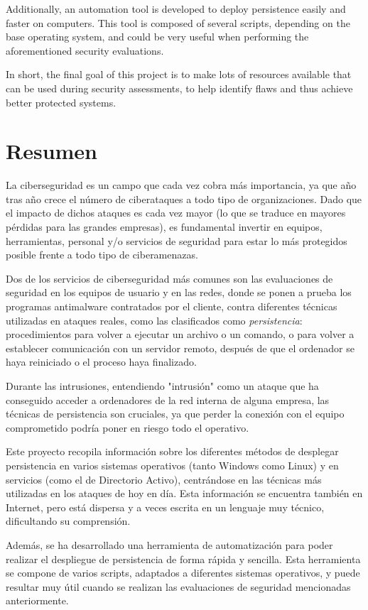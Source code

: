 Additionally, an automation tool is developed to deploy persistence easily and faster on computers. This tool is composed of several scripts, depending on the base operating system, and could be very useful when performing the aforementioned security evaluations.

In short, the final goal of this project is to make lots of resources available that can be used during security assessments, to help identify flaws and thus achieve better protected systems.

\pagebreak
\section*{Resumen} 

La ciberseguridad es un campo que cada vez cobra más importancia, ya que año tras año crece el número de ciberataques a todo tipo de organizaciones. 
Dado que el impacto de dichos ataques es cada vez mayor (lo que se traduce en mayores pérdidas para las grandes empresas), es fundamental invertir en equipos, herramientas, personal y/o servicios de seguridad para estar lo más protegidos posible frente a todo tipo de ciberamenazas.

Dos de los servicios de ciberseguridad más comunes son las evaluaciones de seguridad en los equipos de usuario y en las redes, donde se ponen a prueba los programas antimalware contratados por el cliente, contra diferentes técnicas utilizadas en ataques reales, como las clasificados como \textit{persistencia}: procedimientos para volver a ejecutar un archivo o un comando, o para volver a establecer comunicación con un servidor remoto, después de que el ordenador se haya reiniciado o el proceso haya finalizado.  

Durante las intrusiones, entendiendo "intrusión" como un ataque que ha conseguido acceder a ordenadores de la red interna de alguna empresa, las técnicas de persistencia son cruciales, ya que perder la conexión con el equipo comprometido podría poner en riesgo todo el operativo.

Este proyecto recopila información sobre los diferentes métodos de desplegar persistencia en varios sistemas operativos (tanto Windows como Linux) y en servicios (como el de Directorio Activo), centrándose en las técnicas más utilizadas en los ataques de hoy en día. Esta información se encuentra también en Internet, pero está dispersa y a veces escrita en un lenguaje muy técnico, dificultando su comprensión.

Además, se ha desarrollado una herramienta de automatización para poder realizar el despliegue de persistencia de forma rápida y sencilla. Esta herramienta se compone de varios scripts, adaptados a diferentes sistemas operativos, y puede resultar muy útil cuando se realizan las evaluaciones de seguridad mencionadas anteriormente.

